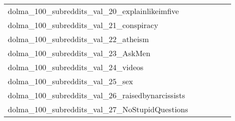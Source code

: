 {\begin{longtable}{m{6cm}m{1.7cm}m{1.7cm}m{1.7cm}m{1.7cm}m{1.7cm}}
	dolma\_100\_subreddits\_val\_20\_explainlikeimfive  & \colorbox[HTML]{ffffe5}{\makebox[\mywidth][c]{18.35}} & \colorbox[HTML]{d1ec9f}{\makebox[\mywidth][c]{17.21}} & \colorbox[HTML]{ffffe5}{\makebox[\mywidth][c]{18.59}} & \colorbox[HTML]{eaf7af}{\makebox[\mywidth][c]{17.32}} & \colorbox[HTML]{77c578}{\makebox[\mywidth][c]{17.03}}\\
	dolma\_100\_subreddits\_val\_21\_conspiracy  & \colorbox[HTML]{ffffe5}{\makebox[\mywidth][c]{23.86}} & \colorbox[HTML]{77c578}{\makebox[\mywidth][c]{22.53}} & \colorbox[HTML]{ffffe5}{\makebox[\mywidth][c]{24.09}} & \colorbox[HTML]{c5e799}{\makebox[\mywidth][c]{22.67}} & \colorbox[HTML]{7cc77a}{\makebox[\mywidth][c]{22.54}}\\
	dolma\_100\_subreddits\_val\_22\_atheism  & \colorbox[HTML]{ffffe5}{\makebox[\mywidth][c]{21.23}} & \colorbox[HTML]{9fd688}{\makebox[\mywidth][c]{20.18}} & \colorbox[HTML]{ffffe5}{\makebox[\mywidth][c]{21.43}} & \colorbox[HTML]{bbe395}{\makebox[\mywidth][c]{20.23}} & \colorbox[HTML]{77c578}{\makebox[\mywidth][c]{20.13}}\\
	dolma\_100\_subreddits\_val\_23\_AskMen  & \colorbox[HTML]{ffffe5}{\makebox[\mywidth][c]{20.00}} & \colorbox[HTML]{c1e597}{\makebox[\mywidth][c]{19.04}} & \colorbox[HTML]{ffffe5}{\makebox[\mywidth][c]{20.11}} & \colorbox[HTML]{dbf1a4}{\makebox[\mywidth][c]{19.10}} & \colorbox[HTML]{77c578}{\makebox[\mywidth][c]{18.94}}\\
	dolma\_100\_subreddits\_val\_24\_videos  & \colorbox[HTML]{ffffe5}{\makebox[\mywidth][c]{22.26}} & \colorbox[HTML]{daf0a4}{\makebox[\mywidth][c]{21.24}} & \colorbox[HTML]{ffffe5}{\makebox[\mywidth][c]{22.51}} & \colorbox[HTML]{e5f5ac}{\makebox[\mywidth][c]{21.29}} & \colorbox[HTML]{77c578}{\makebox[\mywidth][c]{21.04}}\\
	dolma\_100\_subreddits\_val\_25\_sex  & \colorbox[HTML]{ffffe5}{\makebox[\mywidth][c]{21.13}} & \colorbox[HTML]{d3eda0}{\makebox[\mywidth][c]{20.13}} & \colorbox[HTML]{ffffe5}{\makebox[\mywidth][c]{21.30}} & \colorbox[HTML]{c1e597}{\makebox[\mywidth][c]{20.09}} & \colorbox[HTML]{77c578}{\makebox[\mywidth][c]{19.98}}\\
	dolma\_100\_subreddits\_val\_26\_raisedbynarcissists  & \colorbox[HTML]{ffffe5}{\makebox[\mywidth][c]{22.07}} & \colorbox[HTML]{a0d789}{\makebox[\mywidth][c]{21.08}} & \colorbox[HTML]{ffffe5}{\makebox[\mywidth][c]{22.48}} & \colorbox[HTML]{d5eea1}{\makebox[\mywidth][c]{21.20}} & \colorbox[HTML]{77c578}{\makebox[\mywidth][c]{21.02}}\\
	dolma\_100\_subreddits\_val\_27\_NoStupidQuestions  & \colorbox[HTML]{ffffe5}{\makebox[\mywidth][c]{19.66}} & \colorbox[HTML]{aadc8d}{\makebox[\mywidth][c]{18.59}} & \colorbox[HTML]{ffffe5}{\makebox[\mywidth][c]{19.87}} & \colorbox[HTML]{d1ec9f}{\makebox[\mywidth][c]{18.68}} & \colorbox[HTML]{77c578}{\makebox[\mywidth][c]{18.52}}\\

\end{longtable}}
